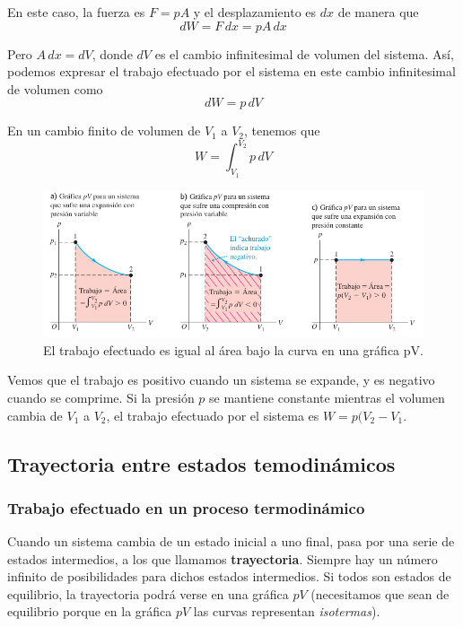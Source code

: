 \documentclass[12pt]{article}
\begin{document}
  En este caso, la fuerza es $ F = pA $ y el desplazamiento es $ dx $ de manera que
  \[
    dW = F\,dx = pA\,dx
  \]

  Pero $ A\,dx = dV $, donde $ dV $ es el cambio infinitesimal de volumen del sistema. Así, podemos expresar el trabajo efectuado por el sistema en este cambio infinitesimal de volumen como 
  \[
  dW = p\,dV
  \]

  En un cambio finito de volumen de $ V_{1} $ a $ V_{2} $, tenemos que
  \[
  W = \int_{V_{1}}^{V_{2}} p \,dV
  \]

  \begin{figure}[H]
    \centering
    \includegraphics[width=0.7\linewidth]{imagenes/trabajo-g-pv.png}
    \caption{El trabajo efectuado es igual al área bajo la curva en una gráfica pV.}
    \label{fig:trabajo-pv}
  \end{figure}
  
  Vemos que el trabajo es positivo cuando un sistema se expande, y es negativo cuando se comprime. Si la presión $ p $ se mantiene constante mientras el volumen cambia de $ V_{1} $ a $ V_{2} $, el trabajo efectuado por el sistema es $ W = p(V_{2}-V_{1} $.

  \vspace{0.2cm}

  \subsection{Trayectoria entre estados temodinámicos}
  \subsubsection{Trabajo efectuado en un proceso termodinámico}
  Cuando un sistema cambia de un estado inicial a uno final, pasa por una serie de estados intermedios, a los que llamamos \textbf{trayectoria}. Siempre hay un número infinito de posibilidades para dichos estados intermedios. Si todos son estados de equilibrio, la trayectoria podrá verse en una gráfica $ pV $ (necesitamos que sean de equilibrio porque en la gráfica $ pV $ las curvas representan \textit{isotermas}).
\end{document}
